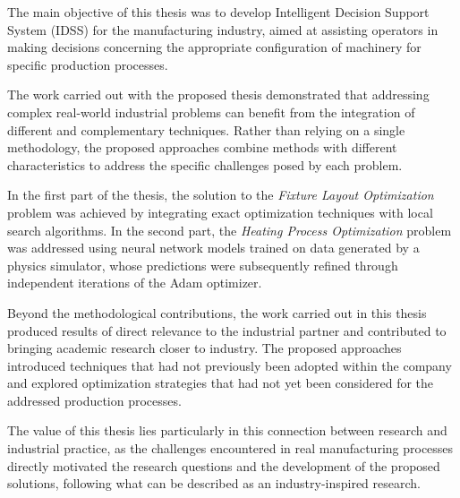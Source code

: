 \label{chap:overall_conclusion}

The main objective of this thesis was to develop Intelligent Decision Support System (IDSS) for the manufacturing industry, aimed at assisting operators in making decisions concerning the appropriate configuration of machinery for specific production processes.

The work carried out with the proposed thesis demonstrated that addressing complex real-world industrial problems can benefit from the integration of different and complementary techniques. Rather than relying on a single methodology, the proposed approaches combine methods with different characteristics to address the specific challenges posed by each problem.

In the first part of the thesis, the solution to the \emph{Fixture Layout Optimization} problem was achieved by integrating exact optimization techniques with local search algorithms. In the second part, the \emph{Heating Process Optimization} problem was addressed using neural network models trained on data generated by a physics simulator, whose predictions were subsequently refined through independent iterations of the Adam optimizer.

Beyond the methodological contributions, the work carried out in this thesis produced results of direct relevance to the industrial partner and contributed to bringing academic research closer to industry. The proposed approaches introduced techniques that had not previously been adopted within the company and explored optimization strategies that had not yet been considered for the addressed production processes.

The value of this thesis lies particularly in this connection between research and industrial practice, as the challenges encountered in real manufacturing processes directly motivated the research questions and the development of the proposed solutions, following what can be described as an industry-inspired research.

